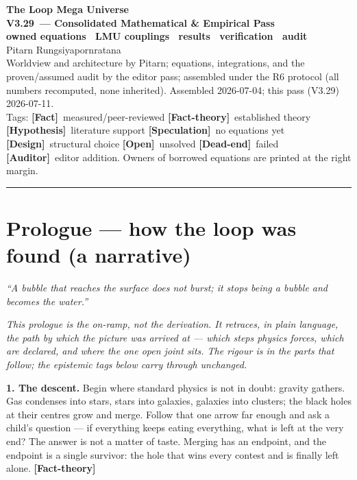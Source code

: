 \documentclass[11pt]{article}
\newcommand{\lmuver}{3.29}
\newcommand{\Fact}{\textbf{\textcolor{green!45!black}{[Fact]}}}
\newcommand{\Hyp}{\textbf{\textcolor{blue!55!black}{[Hypothesis]}}}
\newcommand{\Spec}{\textbf{\textcolor{orange!75!black}{[Speculation]}}}
\newcommand{\Dead}{\textbf{\textcolor{red!65!black}{[Dead-end]}}}
\newcommand{\Design}{\textbf{\textcolor{purple!65!black}{[Design]}}}
\newcommand{\Open}{\textbf{\textcolor{gray!10!black}{[Open]}}}
\newcommand{\Auditor}{\textbf{\textcolor{teal!55!black}{[Auditor]}}}
\newcommand{\factth}{\textcolor{green!40!black}{\textbf{[Fact-theory]}}}
\begin{document}
\begin{center}
{\Huge\bfseries The Loop Mega Universe}\\[4pt]
{\LARGE\bfseries V\lmuver\ --- Consolidated Mathematical \& Empirical Pass}\\[3pt]
{\large\bfseries owned equations \textperiodcentered\ LMU couplings \textperiodcentered\ results \textperiodcentered\ verification \textperiodcentered\ audit}\\[8pt]
{\large Pitarn Rungsiyapornratana}\\[2pt]
{\small Worldview and architecture by Pitarn; equations, integrations, and the proven/assumed audit by the editor pass; assembled under the R6 protocol (all numbers recomputed, none inherited). Assembled 2026-07-04; this pass (V\lmuver) 2026-07-11.}\\[2pt]
{\small Tags: \Fact\ measured/peer-reviewed \quad \factth\ established theory \quad \Hyp\ literature support \quad \Spec\ no equations yet \quad \Design\ structural choice \quad \Open\ unsolved \quad \Dead\ failed \quad \Auditor\ editor addition. Owners of borrowed equations are printed at the right margin.}
\end{center}
\hrule\vspace{6pt}
\part*{Prologue --- how the loop was found (a narrative)}
\begin{flushright}\small\emph{``A bubble that reaches the surface does not burst; it stops being a bubble and becomes the water.''}\end{flushright}

\noindent\emph{This prologue is the on-ramp, not the derivation. It retraces, in plain language, the path by which the picture was arrived at --- which steps physics forces, which are declared, and where the one open joint sits. The rigour is in the parts that follow; the epistemic tags below carry through unchanged.}

\medskip
\noindent\textbf{1. The descent.} Begin where standard physics is not in doubt: gravity gathers. Gas condenses into stars, stars into galaxies, galaxies into clusters; the black holes at their centres grow and merge. Follow that one arrow far enough and ask a child's question --- if everything keeps eating everything, what is left at the very end? The answer is not a matter of taste. Merging has an endpoint, and the endpoint is a single survivor: the hole that wins every contest and is finally left alone. \factth
\end{document}
